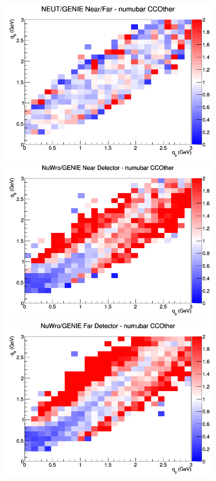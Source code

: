 \begin{figure}[h]
\endminipage
{}
\includegraphics[width=\linewidth]{eff_q0_q3/LAr/ratios/CCOther_NEUT_GENIE_numubar_NF_q3_q0.png}
\endminipage
\newline
{}
\includegraphics[width=\linewidth]{eff_q0_q3/LAr/ratios/CCOther_NuWro_GENIE_numubar_near_q3_q0.png}
\endminipage
{}
\includegraphics[width=\linewidth]{eff_q0_q3/LAr/ratios/CCOther_NuWro_GENIE_numubar_far_q3_q0.png}

\end{figure}
